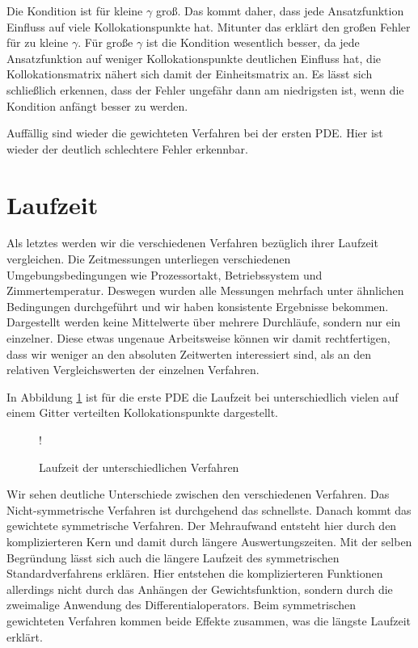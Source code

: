 Die Kondition ist für kleine $\gamma$ groß. Das kommt daher, dass jede Ansatzfunktion \glqq Einfluss\grqq{}  auf viele Kollokationspunkte hat. Mitunter das erklärt den großen Fehler für zu kleine $\gamma$. Für große $\gamma$ ist die Kondition wesentlich besser, da jede Ansatzfunktion auf weniger Kollokationspunkte deutlichen \glqq Einfluss\grqq{} hat, die Kollokationsmatrix \glqq nähert \grqq{} sich damit der Einheitsmatrix an. Es lässt sich schließlich erkennen, dass der Fehler ungefähr dann am niedrigsten ist, wenn die Kondition anfängt besser zu werden. 

Auffällig sind wieder die gewichteten Verfahren bei der ersten \ac{PDE}. Hier ist wieder der deutlich schlechtere Fehler erkennbar.

\section{Laufzeit}
Als letztes werden wir die verschiedenen Verfahren bezüglich ihrer Laufzeit vergleichen. Die Zeitmessungen unterliegen verschiedenen Umgebungsbedingungen wie Prozessortakt, Betriebssystem und Zimmertemperatur. Deswegen wurden alle Messungen mehrfach unter ähnlichen Bedingungen durchgeführt und wir haben konsistente Ergebnisse bekommen. Dargestellt werden keine Mittelwerte über mehrere Durchläufe, sondern nur ein einzelner. Diese etwas ungenaue Arbeitsweise können wir damit rechtfertigen, dass wir weniger an den absoluten Zeitwerten interessiert sind, als an den relativen Vergleichswerten der einzelnen Verfahren.

In Abbildung \ref{fig:Laufzeit} ist für die erste \ac{PDE} die Laufzeit bei unterschiedlich vielen auf einem Gitter verteilten Kollokationspunkte dargestellt.
\begin{figure}[ht]
\centering
\resizebox {\columnwidth} {!} {

}
\caption{Laufzeit der unterschiedlichen Verfahren}
\label{fig:Laufzeit}
\end{figure}

Wir sehen deutliche Unterschiede zwischen den verschiedenen Verfahren. Das Nicht-symmetrische Verfahren ist durchgehend das schnellste. Danach kommt das gewichtete symmetrische Verfahren. Der Mehraufwand entsteht hier durch den komplizierteren Kern und damit durch längere Auswertungszeiten. Mit der selben Begründung lässt sich auch die längere Laufzeit des symmetrischen Standardverfahrens erklären. Hier entstehen die komplizierteren Funktionen allerdings nicht durch das Anhängen der Gewichtsfunktion, sondern durch die zweimalige Anwendung des Differentialoperators. Beim symmetrischen gewichteten Verfahren kommen beide Effekte zusammen, was die längste Laufzeit erklärt.

